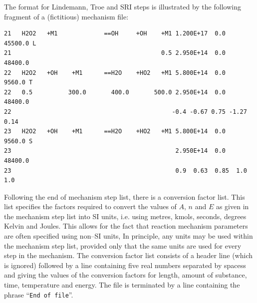 \documentclass[dvips]{article}
\begin{document}
The format for Lindemann, Troe and SRI steps is illustrated by the
following fragment of a (fictitious) mechanism file:
\begin{verbatim}
21   H2O2   +M1             ==OH     +OH    +M1 1.200E+17  0.0    45500.0 L
21                                          0.5 2.950E+14  0.0    48400.0
22   H2O2   +OH    +M1      ==H2O    +HO2   +M1 5.800E+14  0.0     9560.0 T
22   0.5          300.0       400.0       500.0 2.950E+14  0.0    48400.0
22                                             -0.4 -0.67 0.75 -1.27 0.14
23   H2O2   +OH    +M1      ==H2O    +HO2   +M1 5.800E+14  0.0     9560.0 S
23                                              2.950E+14  0.0    48400.0
23                                              0.9  0.63  0.85  1.0  1.0
\end{verbatim}
Following the end of mechanism step list, there is a conversion factor list.
This list specifies the factors required to convert the values of $A$,
$n$ and $E$ as given in the mechanism step list into SI units, i.e.
using metres, kmols, seconds, degrees Kelvin and Joules.  This allows
for the fact that reaction mechanism parameters are often specified
using non--SI units,  In principle, any units may be used within the
mechanism step list, provided only that the same units are used for
every step in the mechanism.  The conversion factor list consists of
a header line (which is ignored) followed by a line containing five real
numbers separated by spacess and giving the values of the conversion
factors for length, amount of substance, time, temperature and energy.
The file is terminated by a line containing the phrase ``{\tt End of file}''. 
\end{document}

